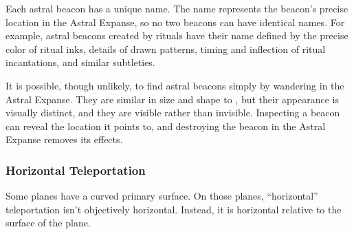       Each astral beacon has a unique name.
      The name represents the beacon's precise location in the Astral Expanse, so no two beacons can have identical names.
      For example, astral beacons created by rituals have their name defined by the precise color of ritual inks, details of drawn patterns, timing and inflection of ritual incantations, and similar subtleties.

      It is possible, though unlikely, to find astral beacons simply by wandering in the Astral Expanse.
      They are similar in size and shape to , but their appearance is visually distinct, and they are visible rather than invisible.
      Inspecting a beacon can reveal the location it points to, and destroying the beacon in the Astral Expanse removes its effects.

    \subsubsection{Horizontal Teleportation}
      Some planes have a curved primary surface.
      On those planes, ``horizontal'' teleportation isn't objectively horizontal.
      Instead, it is horizontal relative to the surface of the plane.
